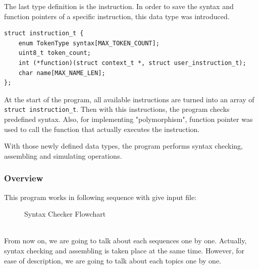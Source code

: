 \documentclass{homework}
\begin{document}
The last type definition is the instruction. In order to save the syntax and function pointers of a specific instruction, this data type was introduced.
\\
\begin{center}
\begin{code}
\begin{verbatim}
struct instruction_t {
    enum TokenType syntax[MAX_TOKEN_COUNT];
    uint8_t token_count;
    int (*function)(struct context_t *, struct user_instruction_t);
    char name[MAX_NAME_LEN];
};
\end{verbatim}
\end{code}
\end{center}

At the start of the program, all available instructions are turned into an array of \texttt{struct instruction_t}. Then with this instructions, the program checks predefined syntax. Also, for implementing "polymorphism", function pointer was used to call the function that actually executes the instruction. 

With those newly defined data types, the program performs syntax checking, assembling and simulating operations. 

\pagebreak

\subsubsection{Overview}
This program works in following sequence with give input file:
\\
\begin{figure}[h]
\begin{center}
\caption{Syntax Checker Flowchart}
\end{center}
\end{figure}
\\
From now on, we are going to talk about each sequences one by one. Actually, syntax checking and assembling is taken place at the same time. However, for ease of description, we are going to talk about each topics one by one.
\end{document}
